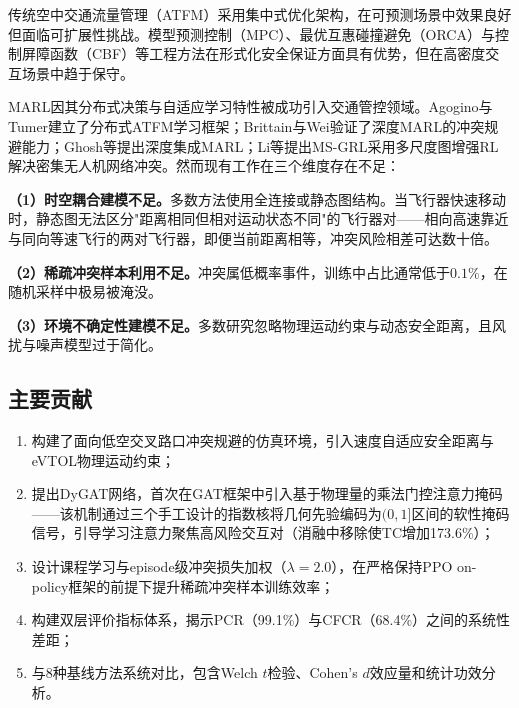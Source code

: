 \documentclass[12pt,a4paper,UTF8]{ctexart}
\begin{document}
传统空中交通流量管理（ATFM）采用集中式优化架构\cite{ref2}，在可预测场景中效果良好但面临可扩展性挑战。模型预测控制（MPC）\cite{ref3}、最优互惠碰撞避免（ORCA）\cite{ref4}与控制屏障函数（CBF）\cite{ref5}等工程方法在形式化安全保证方面具有优势，但在高密度交互场景中趋于保守。

MARL因其分布式决策与自适应学习特性被成功引入交通管控领域。Agogino与Tumer\cite{ref6,ref7}建立了分布式ATFM学习框架；Brittain与Wei\cite{ref8}验证了深度MARL的冲突规避能力；Ghosh等\cite{ref9}提出深度集成MARL；Li等\cite{ref10}提出MS-GRL采用多尺度图增强RL解决密集无人机网络冲突。然而现有工作在三个维度存在不足：

\textbf{（1）时空耦合建模不足。}多数方法使用全连接或静态图结构\cite{ref8,ref10,ref11}。当飞行器快速移动时，静态图无法区分"距离相同但相对运动状态不同"的飞行器对——相向高速靠近与同向等速飞行的两对飞行器，即便当前距离相等，冲突风险相差可达数十倍。

\textbf{（2）稀疏冲突样本利用不足。}冲突属低概率事件，训练中占比通常低于$0.1\%$\cite{ref12,ref13}，在随机采样中极易被淹没。

\textbf{（3）环境不确定性建模不足。}多数研究忽略物理运动约束与动态安全距离\cite{ref11}，且风扰与噪声模型过于简化。

\subsection{主要贡献}

\begin{enumerate}[label=(\arabic*)]
    \item 构建了面向低空交叉路口冲突规避的仿真环境，引入速度自适应安全距离与eVTOL物理运动约束；
    \item 提出DyGAT网络，首次在GAT框架中引入基于物理量的乘法门控注意力掩码——该机制通过三个手工设计的指数核将几何先验编码为$(0,1]$区间的软性掩码信号，引导学习注意力聚焦高风险交互对（消融中移除使TC增加173.6\%）；
    \item 设计课程学习与episode级冲突损失加权（$\lambda=2.0$），在严格保持PPO on-policy框架的前提下提升稀疏冲突样本训练效率；
    \item 构建双层评价指标体系，揭示PCR（99.1\%）与CFCR（68.4\%）之间的系统性差距；
    \item 与8种基线方法系统对比，包含Welch $t$检验、Cohen's $d$效应量和统计功效分析。
\end{enumerate}

\end{document}
